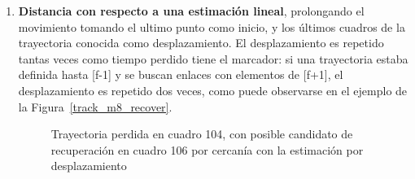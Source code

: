 \begin{itemize}
\begin{enumerate}
  \item \textbf{Distancia con respecto a una estimación lineal}, prolongando el movimiento tomando el ultimo punto como inicio, y los últimos cuadros de la trayectoria conocida como desplazamiento. El desplazamiento es repetido tantas veces como tiempo perdido tiene el marcador: si una trayectoria estaba definida hasta [f-1] y se buscan enlaces con elementos de [f+1], el desplazamiento es repetido dos veces, como puede observarse en el ejemplo de la Figura~\ref{track_m8_recover}. 
 
\begin{figure}[ht!]
 \centering
  \hspace{3 mm}
	
\caption{Trayectoria perdida en cuadro 104, con posible candidato de recuperación en cuadro 106 por cercanía con la estimación por desplazamiento}
\label{inventario_trayectoria_direccional}
\end{figure} 
  

\end{enumerate}
\end{itemize}

